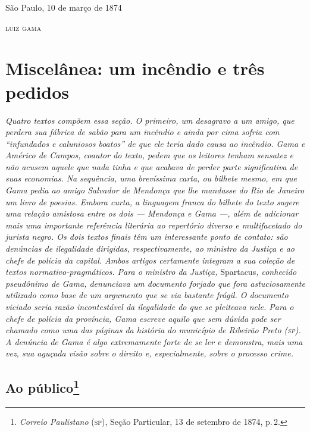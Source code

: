 \begin{flushright}
São Paulo, 10 de março de 1874

\textsc{luiz gama}
\end{flushright}

\part{Miscelânea: um incêndio e três pedidos}

\begin{argumento}
\emph{Quatro textos compõem essa seção. O primeiro, um desagravo a um
amigo, que perdera sua fábrica de sabão para um incêndio e ainda por
cima sofria com ``infundados e caluniosos boatos'' de que ele teria dado
causa ao incêndio. Gama e Américo de Campos, coautor do texto, pedem que
os leitores tenham sensatez e não acusem aquele que nada tinha e que
acabava de perder parte significativa de suas economias. Na sequência,
uma brevíssima carta, ou bilhete mesmo, em que Gama pedia ao amigo
Salvador de Mendonça que lhe mandasse do Rio de Janeiro um livro de
poesias. Embora curta, a linguagem franca do bilhete do texto sugere uma
relação amistosa entre os dois --- Mendonça e Gama ---, além de adicionar
mais uma importante referência literária ao repertório diverso e
multifacetado do jurista negro. Os dois textos finais têm um
interessante ponto de contato: são denúncias de ilegalidade dirigidas,
respectivamente, ao ministro da Justiça e ao chefe de polícia da
capital. Ambos artigos certamente integram a sua coleção de textos
normativo-pragmáticos. Para o ministro da Justiça,} Spartacus\emph{,
conhecido pseudônimo de Gama, denunciava um documento forjado que fora
astuciosamente utilizado como base de um argumento que se via bastante
frágil. O documento viciado seria razão incontestável da ilegalidade do
que se pleiteava nele. Para o chefe de polícia da província, Gama
escreve aquilo que sem dúvida pode ser chamado como uma das páginas da
história do município de Ribeirão Preto (\textsc{sp}). A denúncia de Gama é algo
extremamente forte de se ler e demonstra, mais uma vez, sua aguçada
visão sobre o direito e, especialmente, sobre o processo crime.}
\end{argumento}

\chapter{Ao público\footnote{\emph{Correio Paulistano} (\textsc{sp}), Seção Particular,
  13 de setembro de 1874, p.\,2.}} %

